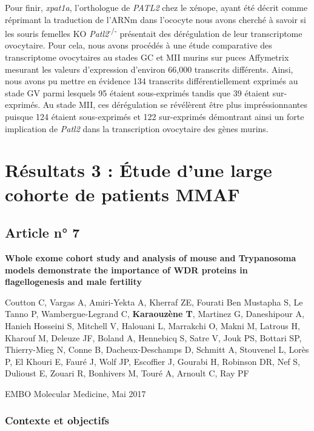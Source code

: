 \documentclass[12pt,twoside]{reedthesis}
\theoremstyle{definition}
\theoremstyle{definition}
\theoremstyle{remark}
\begin{document}
  Pour finir, \emph{xpat1a}, l'orthologue de \emph{PATL2} chez le xénope,
  ayant été décrit comme réprimant la traduction de l'ARNm dans l'ococyte
  nous avons cherché à savoir si les souris femelles KO
  \emph{Patl2}\textsuperscript{-/-} présentait des dérégulation de leur
  transcriptome ovocytaire. Pour cela, nous avons procédés à une étude
  comparative des transcriptome ovocytaires au stades GC et MII murins sur
  puces Affymetrix mesurant les valeurs d'expression d'environ 66,000
  transcrits différents. Ainsi, nous avons pu mettre en évidence 134
  transcrits différentiellement exprimés au stade GV parmi lesquels 95
  étaient sous-exprimés tandis que 39 étaient sur-exprimés. Au stade MII,
  ces dérégulation se révélèrent être plus impréssionnantes puisque 124
  étaient sous-exprimés et 122 sur-exprimés démontrant ainsi un forte
  implication de \emph{Patl2} dans la transcription ovocytaire des gènes
  murins.
  
  \newpage  
  
  \section{Résultats 3 : Étude d'une large cohorte de patients
  MMAF}\label{resultats-3-etude-dune-large-cohorte-de-patients-mmaf}
  
  \subsection{Article n° 7}\label{article-n-7}
  
  \textbf{Whole exome cohort study and analysis of mouse and Trypanosoma
  models demonstrate the importance of WDR proteins in flagellogenesis and
  male fertility}
  
  Coutton C, Vargas A, Amiri-Yekta A, Kherraf ZE, Fourati Ben Mustapha S,
  Le Tanno P, Wambergue-Legrand C, \textbf{Karaouzène T}, Martinez G,
  Daneshipour A, Hanieh Hosseini S, Mitchell V, Halouani L, Marrakchi O,
  Makni M, Latrous H, Kharouf M, Deleuze JF, Boland A, Hennebicq S, Satre
  V, Jouk PS, Bottari SP, Thierry-Mieg N, Conne B, Dacheux-Deschamps D,
  Schmitt A, Stouvenel L, Lorès P, El Khouri E, Fauré J, Wolf JP,
  Escoffier J, Gourabi H, Robinson DR, Nef S, Dulioust E, Zouari R,
  Bonhivers M, Touré A, Arnoult C, Ray PF
  
  EMBO Molecular Medicine, Mai 2017
  
  \newpage
  
  \subsubsection{Contexte et objectifs}\label{contexte-et-objectifs-4}
  
\end{document}
